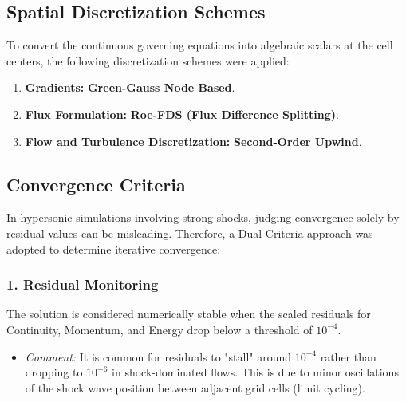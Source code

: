 \subsection{Spatial Discretization Schemes}
To convert the continuous governing equations into algebraic scalars at the cell centers, the following discretization schemes were applied:

\begin{enumerate}
    \item \textbf{Gradients:} \textbf{Green-Gauss Node Based}.
    \item \textbf{Flux Formulation:} \textbf{Roe-FDS (Flux Difference Splitting)}.
    
    \item \textbf{Flow and Turbulence Discretization:} \textbf{Second-Order Upwind}.
\end{enumerate}

\subsection{Convergence Criteria}
In hypersonic simulations involving strong shocks, judging convergence solely by residual values can be misleading. Therefore, a Dual-Criteria approach was adopted to determine iterative convergence:

\subsubsection*{1. Residual Monitoring}
The solution is considered numerically stable when the scaled residuals for Continuity, Momentum, and Energy drop below a threshold of $10^{-4}$.
\begin{itemize}
    \item \textit{Comment:} It is common for residuals to "stall" around $10^{-4}$ rather than dropping to $10^{-6}$ in shock-dominated flows. This is due to minor oscillations of the shock wave position between adjacent grid cells (limit cycling).
\end{itemize}

